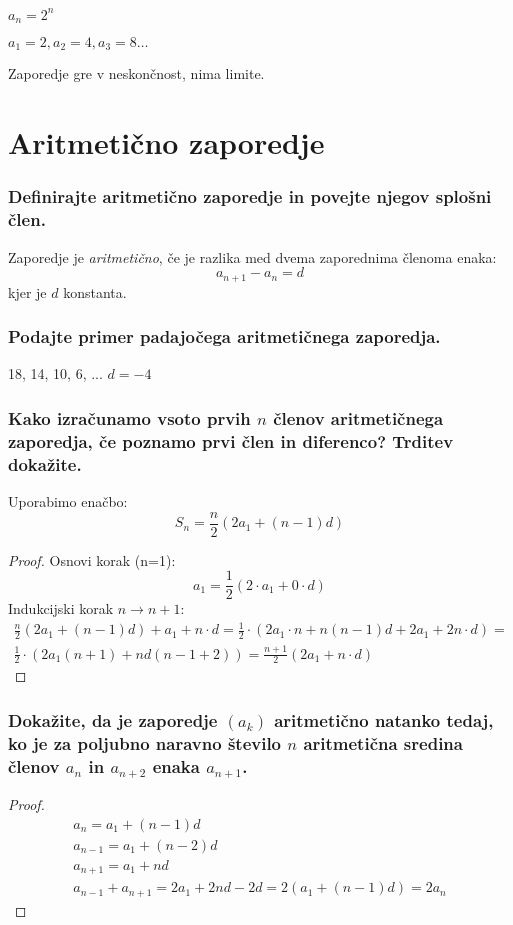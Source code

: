 \documentclass{article}
\begin{document}
$a_{n}=2^{n}$

$a_{1}=2, a_{2}=4, a_{3}=8 \ldots$

Zaporedje gre v neskončnost, nima limite.


\section{Aritmetično zaporedje}
\subsubsection*{Definirajte aritmetično zaporedje in povejte njegov splošni člen.}

Zaporedje je \textit{aritmetično}, če je razlika med dvema zaporednima členoma enaka:
$$
a_{n+1} - a_n = d
$$
kjer je $d$ konstanta.
\subsubsection*{Podajte primer padajočega aritmetičnega zaporedja.}

18, 14, 10, 6, ... $d=-4$

\subsubsection*{Kako izračunamo vsoto prvih $n$ členov aritmetičnega zaporedja, če poznamo prvi člen in diferenco? Trditev dokažite.}

Uporabimo enačbo:
$$
S_n = \frac{n}{2}(2a_1 + (n-1)d)
$$

\begin{proof}
    Osnovi korak (n=1):
    $$
        a_1 = \frac{1}{2}(2\cdot a_1 + 0\cdot d) 
    $$
    Indukcijski korak $n \rightarrow n + 1$:
    \begin{gather*}
        \frac{n}{2}(2a_1 + (n-1)d) + a_1 + n \cdot d = \frac{1}{2} \cdot (2a_1\cdot n + n(n-1)d + 2a_1 + 2n \cdot d) = \\
        \frac{1}{2} \cdot (2a_1(n+1) + nd(n-1 + 2)) = \frac{n+1}{2}(2a_1 + n \cdot d)
    \end{gather*}
\end{proof}
\subsubsection*{Dokažite, da je zaporedje $\left(a_{k}\right)$ aritmetično natanko tedaj, ko je za poljubno naravno število $n$ aritmetična sredina členov $a_{n}$ in $a_{n+2}$ enaka $a_{n+1}$.}

\begin{proof}
    \begin{gather}
        a_n = a_1 + (n-1)d \\
        a_{n-1} = a_1 + (n-2)d \\
        a_{n+1} = a_1 + nd \\
        a_{n-1} + a_{n+1} = 2a_1 + 2nd - 2d = 2(a_1+(n-1)d) = 2a_n
    \end{gather}
\end{proof}
\end{document}
